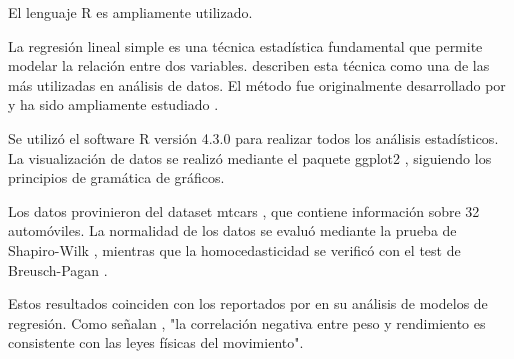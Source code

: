 
El lenguaje R \parencite{rcore2023} es ampliamente utilizado.




La regresión lineal simple es una técnica estadística fundamental \parencite{montgomery2012}
que permite modelar la relación entre dos variables. \textcite{james2013} describen
esta técnica como una de las más utilizadas en análisis de datos. El método fue
originalmente desarrollado por \textcite{pearson1896} y ha sido ampliamente estudiado
\parencite{kutner2005, cohen2003}.

Se utilizó el software R versión 4.3.0 \parencite{rcore2023} para realizar todos
los análisis estadísticos. La visualización de datos se realizó mediante el paquete
ggplot2 \parencite{wickham2016}, siguiendo los principios de gramática de gráficos.

Los datos provinieron del dataset mtcars \parencite{henderson1981, motor1974}, que
contiene información sobre 32 automóviles. La normalidad de los datos se evaluó
mediante la prueba de Shapiro-Wilk \parencite{shapiro1965}, mientras que la
homocedasticidad se verificó con el test de Breusch-Pagan \parencite{breusch1979}.

Estos resultados coinciden con los reportados por \textcite{montgomery2012} en
su análisis de modelos de regresión. Como señalan \textcite[p.~156]{james2013}, "la
correlación negativa entre peso y rendimiento es consistente con las leyes
físicas del movimiento".